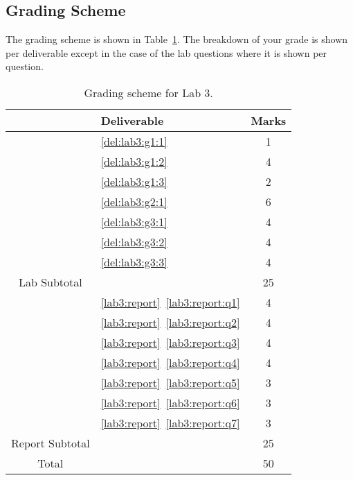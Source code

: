 \subsection{Grading Scheme}
The grading scheme is shown in Table~\ref{tab:lab3:grading}. The breakdown of
your grade is shown per deliverable except in the case of the lab
questions where it is shown per question.
%
\begin{table}
\centering
\begin{tabular}{c|l|c}
        & Deliverable           & Marks  \\ \hline
        & \ref{del:lab3:g1:1}         & 1       \\ \hline
        & \ref{del:lab3:g1:2}         & 4      \\ \hline
        & \ref{del:lab3:g1:3}        & 2       \\ \hline
        & \ref{del:lab3:g2:1}        & 6       \\ \hline
        & \ref{del:lab3:g3:1}         & 4      \\ \hline
        & \ref{del:lab3:g3:2}         & 4       \\ \hline
        & \ref{del:lab3:g3:3}         & 4       \\ \hhline{=|=|=}
Lab Subtotal&                       & 25      \\ \hhline{=|=|=}
        & \ref{lab3:report}~\ref{lab3:report:q1}  & 4       \\ \hline
        & \ref{lab3:report}~\ref{lab3:report:q2}  & 4       \\ \hline
        & \ref{lab3:report}~\ref{lab3:report:q3}  & 4       \\ \hline
        & \ref{lab3:report}~\ref{lab3:report:q4}  & 4       \\ \hline
        & \ref{lab3:report}~\ref{lab3:report:q5}  & 3      \\ \hline
        & \ref{lab3:report}~\ref{lab3:report:q6}  & 3      \\ \hline
        & \ref{lab3:report}~\ref{lab3:report:q7}  & 3      \\ \hhline{=|=|=}
Report Subtotal&  & 25 \\ \hhline{=|=|=}
  Total &                       & 50
\end{tabular}
\caption[Grading Scheme for Lab 3]{Grading scheme for Lab 3.}
\label{tab:lab3:grading}
\end{table}
%
